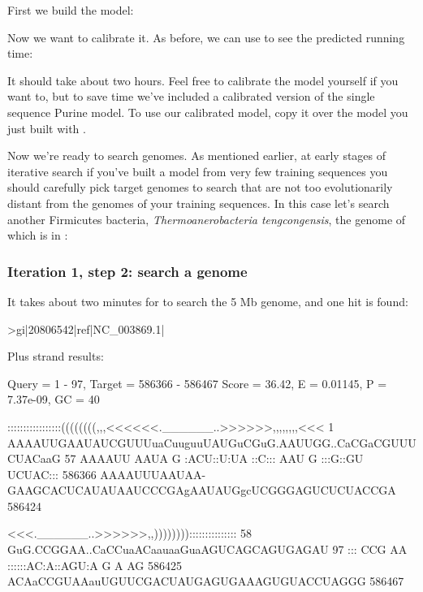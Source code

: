First we build the model:


Now we want to calibrate it. As before, we can use 
to see the predicted running time:


It should take about two hours. Feel free to calibrate the model yourself if you want
to, but to save time we've included  a
calibrated version of the single sequence Purine model. To use our
calibrated model, copy it over the model you just built with 
.

Now we're ready to search genomes. As mentioned earlier, at early
stages of iterative search if you've built a model from very few
training sequences you should carefully pick target genomes to search that are
not too evolutionarily distant from the genomes of your training
sequences. In this case let's search another Firmicutes bacteria,
\emph{Thermoanerobacteria tengcongensis}, the genome of which is in \newline
{}:

\subsubsection{Iteration 1, step 2: search a genome}

It takes about two minutes for  to search the 5 Mb
genome, and one hit is found:

\begin{sreoutput}
>gi|20806542|ref|NC_003869.1|

  Plus strand results:

 Query = 1 - 97, Target = 586366 - 586467
 Score = 36.42, E = 0.01145, P = 7.37e-09, GC =  40

           :::::::::::::::::((((((((,,,<<<<<<.______..>>>>>>,,,,,,,,<<<
         1 AAAAUUGAAUAUCGUUUuaCuuguuUAUGuCGuG.AAUUGG..CaCGaCGUUUCUACaaG 57      
           AAAAUU AAUA  G   :ACU::U:UA ::C::: AAU  G  :::G::GU UCUAC:::
    586366 AAAAUUUAAUAA-GAAGCACUCAUAUAAUCCCGAgAAUAUGgcUCGGGAGUCUCUACCGA 586424  

           <<<.______..>>>>>>,,)))))))):::::::::::::::
        58 GuG.CCGGAA..CaCCuaACaauaaGuaAGUCAGCAGUGAGAU 97      
           ::: CCG AA  ::::::AC:A::AGU:A    G A   AG  
    586425 ACAaCCGUAAauUGUUCGACUAUGAGUGAAAGUGUACCUAGGG 586467  
\end{sreoutput}

